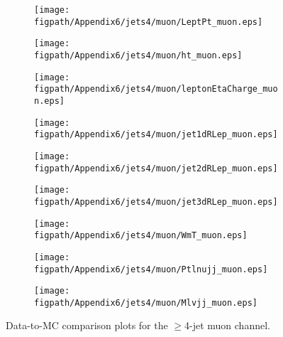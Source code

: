 \begin{figure}[!hbtp]
    \centering
    \begin{subfigure}[t]{0.317\textwidth}
        \texttt{[image: \\figpath/Appendix6/jets4/muon/LeptPt\_muon.eps]}
    \end{subfigure}
    \begin{subfigure}[t]{0.317\textwidth}
        \texttt{[image: \\figpath/Appendix6/jets4/muon/ht\_muon.eps]}
    \end{subfigure}
    \begin{subfigure}[t]{0.317\textwidth}
        \texttt{[image: \\figpath/Appendix6/jets4/muon/leptonEtaCharge\_muon.eps]}
    \end{subfigure}

    \begin{subfigure}[t]{0.317\textwidth}
        \texttt{[image: \\figpath/Appendix6/jets4/muon/jet1dRLep\_muon.eps]}
    \end{subfigure}
    \begin{subfigure}[t]{0.317\textwidth}
        \texttt{[image: \\figpath/Appendix6/jets4/muon/jet2dRLep\_muon.eps]}
    \end{subfigure}
    \begin{subfigure}[t]{0.317\textwidth}
        \texttt{[image: \\figpath/Appendix6/jets4/muon/jet3dRLep\_muon.eps]}
    \end{subfigure}

    \begin{subfigure}[t]{0.317\textwidth}
        \texttt{[image: \\figpath/Appendix6/jets4/muon/WmT\_muon.eps]}
    \end{subfigure}
    \begin{subfigure}[t]{0.317\textwidth}
        \texttt{[image: \\figpath/Appendix6/jets4/muon/Ptlnujj\_muon.eps]}
    \end{subfigure}
    \begin{subfigure}[t]{0.317\textwidth}
        \texttt{[image: \\figpath/Appendix6/jets4/muon/Mlvjj\_muon.eps]}
    \end{subfigure}
    \caption{Data-to-MC comparison plots for the $\geqslant$4-jet muon channel.}
    \label{fig:comparison_plots_jets4_muon_2}
\end{figure}





\pagebreak{}